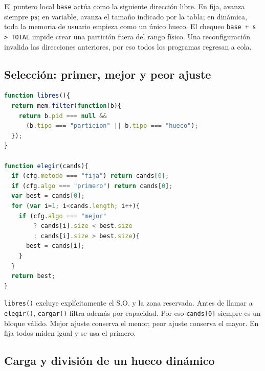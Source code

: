 \documentclass[11pt,a4paper]{article}
\newcommand{\funcion}[1]{\texttt{#1()}}
\begin{document}
El puntero local \texttt{base} actúa como la siguiente dirección libre. En fija,
avanza siempre \texttt{ps}; en variable, avanza el tamaño indicado por la tabla;
en dinámica, toda la memoria de usuario empieza como un único hueco. El chequeo
\texttt{base + s > TOTAL} impide crear una partición fuera del rango físico. Una
reconfiguración invalida las direcciones anteriores, por eso todos los programas
regresan a cola.

\subsection{Selección: primer, mejor y peor ajuste}

\begin{lstlisting}[language=JavaScript,caption={Obtención y selección de bloques candidatos.}]
function libres(){
  return mem.filter(function(b){
    return b.pid === null &&
      (b.tipo === "particion" || b.tipo === "hueco");
  });
}

function elegir(cands){
  if (cfg.metodo === "fija") return cands[0];
  if (cfg.algo === "primero") return cands[0];
  var best = cands[0];
  for (var i=1; i<cands.length; i++){
    if (cfg.algo === "mejor"
        ? cands[i].size < best.size
        : cands[i].size > best.size){
      best = cands[i];
    }
  }
  return best;
}
\end{lstlisting}

\funcion{libres} excluye explícitamente el S.O. y la zona reservada. Antes de
llamar a \funcion{elegir}, \funcion{cargar} filtra además por capacidad. Por eso
\texttt{cands[0]} siempre es un bloque válido. Mejor ajuste conserva el menor;
peor ajuste conserva el mayor. En fija todos miden igual y se usa el primero.

\subsection{Carga y división de un hueco dinámico}
\end{document}
